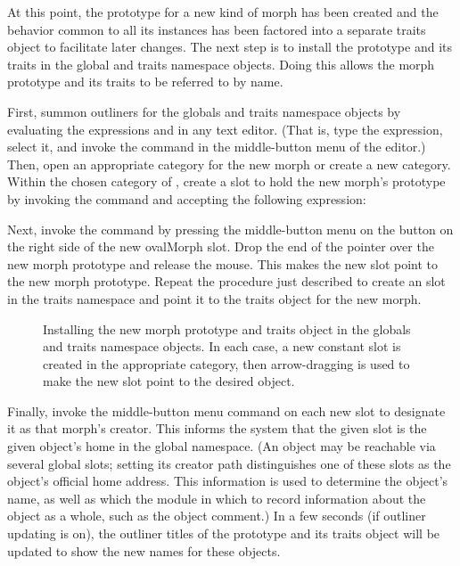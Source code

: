 \documentclass[letterpaper,10pt,english]{sphinxmanual}
\begin{document}
At this point, the prototype for a new kind of morph has been created and the behavior common to all its instances has been factored into a separate traits object to facilitate later changes. The next step is to install the prototype and its traits in the global and traits namespace objects. Doing this allows the morph prototype and its traits to be referred to by name.

First, summon outliners for the globals and traits namespace objects by evaluating the expressions  and  in any text editor. (That is, type the expression, select it, and invoke the  command in the middle-button menu of the editor.) Then, open an appropriate category for the new morph or create a new category. Within the chosen category of , create a slot to hold the new morph's prototype by invoking the  command and accepting the following expression:

\begin{sphinxVerbatim}[commandchars=\\\{\}]
  
\end{sphinxVerbatim}

Next, invoke the  command by pressing the middle-button menu on the button on the right side of the new ovalMorph slot. Drop the end of the pointer over the new morph prototype and release the mouse. This makes the new slot point to the new morph prototype. Repeat the procedure just described to create an  slot in the traits namespace and point it to the traits object for the new morph.
\begin{figure}[htbp]
\centering
\capstart

\noindent{}
\caption{Installing the new morph prototype and traits object in the globals and traits namespace objects. In each case, a new constant slot is created in the appropriate category, then arrow-dragging is used to make the new slot point to the desired object.}\label{\detokenize{morphic:id10}}\end{figure}

Finally, invoke the  middle-button menu command on each new  slot to designate it as that morph's creator. This informs the system that the given slot is the given object's home in the global namespace. (An object may be reachable via several global slots; setting its creator path distinguishes one of these slots as the object's official \sphinxquotedblleft{}home address.\sphinxquotedblright{} This information is used to determine the object's name, as well as which the module in which to record information about the object as a whole, such as the object comment.) In a few seconds (if outliner updating is on), the outliner titles of the  prototype and its traits object will be updated to show the new names for these objects.
\end{document}
